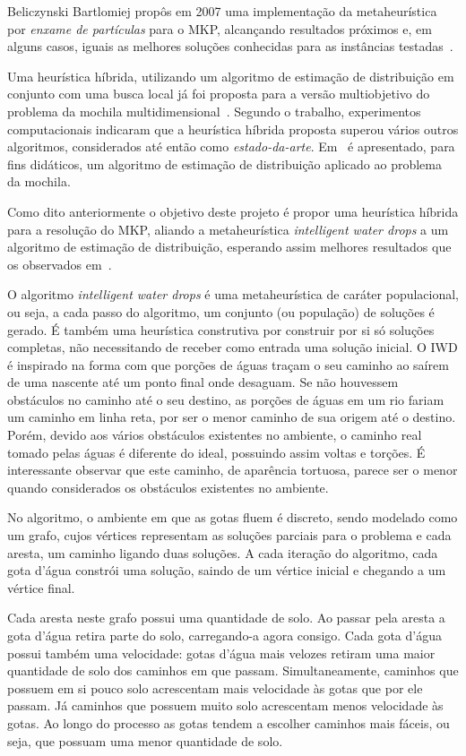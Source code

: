 \documentclass[brazil]{article}
\begin{document}
Beliczynski Bartlomiej propôs em 2007 uma implementação da metaheurística por 
\textit{enxame de partículas} para o MKP, alcançando resultados próximos e,
em alguns casos, iguais as melhores soluções conhecidas para as instâncias
testadas~\cite{Bartlomiej2007}.

Uma heurística híbrida, utilizando um algoritmo de estimação de distribuição
em conjunto com uma busca local já foi proposta para a versão multiobjetivo
do problema da mochila multidimensional~\cite{Li2004}.
Segundo o trabalho, experimentos computacionais indicaram que a heurística
híbrida proposta superou vários outros algoritmos, considerados até então
como \textit{estado-da-arte}.
Em~\cite{Larra2011} é apresentado, para fins didáticos, um algoritmo de
estimação de distribuição aplicado ao pro\-ble\-ma da mochila.

Como dito anteriormente o objetivo deste projeto é propor uma heurística híbrida
para a resolução do MKP, aliando a metaheurística \textit{intelligent water drops} a um
algoritmo de estimação de distribuição, esperando assim melhores resultados que os
observados em~\cite{Hosseini-2008}.

O algoritmo \textit{intelligent water drops} é uma metaheurística de caráter
po\-pu\-la\-cio\-nal, ou seja, a cada passo do algoritmo, um conjunto (ou população) de
soluções é gerado.
É também uma heurística construtiva por construir por si só
soluções completas, não necessitando de receber como entrada uma solução inicial.
O IWD é inspirado na forma com que porções de águas
traçam o seu caminho ao saírem de uma nascente até um ponto final onde desaguam.
Se não houvessem obstáculos no caminho até o seu destino, as porções de águas
em um rio fariam um caminho em linha reta, por ser o menor caminho de sua origem até o destino.
Porém, devido aos vários obstáculos existentes no ambiente,
o caminho real tomado pelas águas é diferente do ideal, possuindo assim voltas e torções.
É interessante observar que este caminho, de aparência tortuosa, parece ser o
menor quando considerados os obstáculos existentes no ambiente.

No algoritmo, o ambiente em que as gotas fluem é discreto, sendo modelado como um grafo, cujos
vértices representam as soluções parciais para o problema e cada aresta, um caminho
ligando duas soluções.
A cada iteração do algoritmo, cada gota d'água constrói uma solução, saindo de um
vértice inicial e chegando a um vértice final.

Cada aresta neste grafo possui uma quantidade de solo.
Ao passar pela aresta a gota d'água retira parte do solo, carregando-a agora consigo.
Cada gota d'água possui também uma velocidade: gotas d'água mais velozes
retiram uma maior quantidade de solo dos caminhos em que passam.
Simultaneamente, caminhos que possuem em si pouco solo acrescentam mais velocidade
às gotas que por ele passam.
Já caminhos que possuem muito solo acrescentam menos velocidade às gotas.
Ao longo do processo as gotas tendem a escolher caminhos mais fáceis, ou seja,
que possuam uma menor quantidade de solo.
\end{document}
